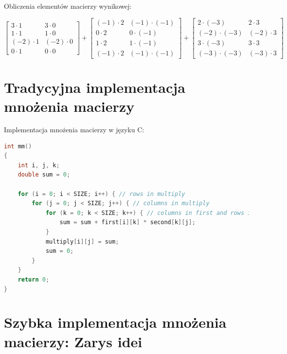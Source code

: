 \documentclass{article}
\begin{document}
Obliczenia elementów macierzy wynikowej:

\[
\begin{bmatrix} 
3 \cdot 1 & 3 \cdot 0 \\ 
1 \cdot 1 & 1 \cdot 0 \\ 
(-2) \cdot 1 & (-2) \cdot 0 \\ 
0 \cdot 1 & 0 \cdot 0 
\end{bmatrix}
+
\begin{bmatrix} 
(-1) \cdot 2 & (-1) \cdot (-1) \\ 
0 \cdot 2 & 0 \cdot (-1) \\ 
1 \cdot 2 & 1 \cdot (-1) \\ 
(-1) \cdot 2 & (-1) \cdot (-1) 
\end{bmatrix}
+
\begin{bmatrix} 
2 \cdot (-3) & 2 \cdot 3 \\ 
(-2) \cdot (-3) & (-2) \cdot 3 \\ 
3 \cdot (-3) & 3 \cdot 3 \\ 
(-3) \cdot (-3) & (-3) \cdot 3 
\end{bmatrix}
\]
\section{Tradycyjna implementacja mnożenia macierzy}
 Implementacja mnożenia macierzy w języku C:

\begin{lstlisting}[language=C]
int mm()
{
    int i, j, k;
    double sum = 0;

    for (i = 0; i < SIZE; i++) { // rows in multiply
        for (j = 0; j < SIZE; j++) { // columns in multiply
            for (k = 0; k < SIZE; k++) { // columns in first and rows in second
                sum = sum + first[i][k] * second[k][j];
            }
            multiply[i][j] = sum;
            sum = 0;
        }
    }
    return 0;
}
\end{lstlisting}
\section{Szybka implementacja mnożenia macierzy: Zarys idei}
\end{document}
